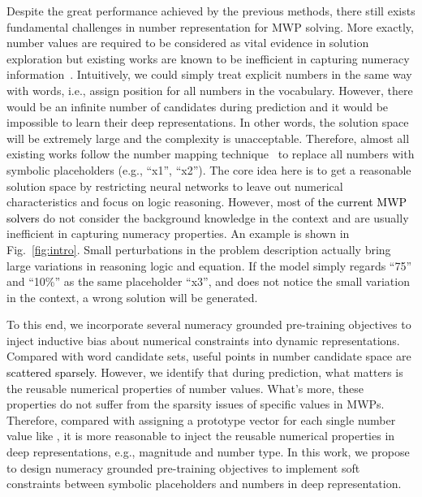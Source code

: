 \documentclass[11pt]{article}
\begin{document}
Despite the great performance achieved by the previous methods, there still exists fundamental challenges in number representation for MWP solving. More exactly, number values are required to be considered as vital evidence in solution exploration but existing works are known to be inefficient in capturing numeracy information~\cite{DBLP:conf/emnlp/WallaceWLSG19}. Intuitively, we could simply treat explicit numbers in the same way with words, i.e., assign position for all numbers in the vocabulary. However, there would be an infinite number of candidates during prediction and it would be impossible to learn their deep representations. In other words, the solution space will be extremely large and the complexity is unacceptable. Therefore, almost all existing works follow the number mapping technique~\citet{wang2017deep} to replace all numbers with symbolic placeholders (e.g., ``x1'', ``x2''). The core idea here is to get a reasonable solution space by restricting neural networks to leave out numerical characteristics and focus on logic reasoning. However, most of \textcolor{black}{the current MWP solvers}
do not consider the background knowledge in the context and are usually inefficient in capturing numeracy properties. An example is shown in Fig.~\ref{fig:intro}. Small perturbations in the problem description actually bring large variations in reasoning logic and equation. If the model simply regards ``75'' and ``10\%'' as the same placeholder ``x3'', and does not notice the small variation in the context, a wrong solution will be generated.



To this end, we incorporate several numeracy grounded pre-training objectives to inject inductive bias about numerical constraints into dynamic representations. Compared with word candidate sets, useful points in number candidate space are \textcolor{black}{scattered sparsely}. However, we identify that during prediction, what matters is the reusable numerical properties of number values. What's more, these properties do not suffer from the sparsity issues of specific values in   MWPs. Therefore, compared with assigning a prototype vector for each single number value like \cite{wu2021math}, it is more reasonable to inject the reusable numerical properties in deep representations, e.g., magnitude and number type. 
In this work, we propose to design numeracy grounded pre-training objectives to implement soft constraints between symbolic placeholders and numbers in deep representation.
\end{document}
